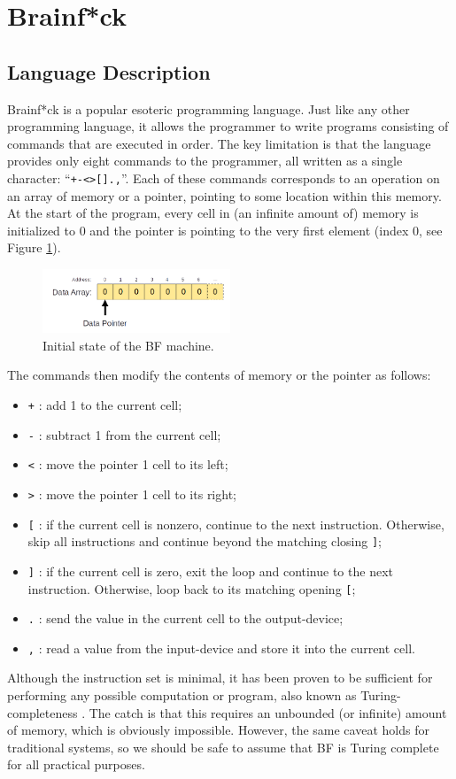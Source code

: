 \section{Brainf*ck}\label{sec:brainfck}
\subsection{Language Description}
Brainf*ck is a popular esoteric programming language. Just like any other programming language, it allows the programmer to write programs consisting of commands that are executed in order. The key limitation is that the language provides only eight commands to the programmer, all written as a single character: ``\texttt{+-<>[].,}''. Each of these commands corresponds to an operation on an array of memory or a pointer, pointing to some location within this memory. At the start of the program, every cell in (an infinite amount of) memory is initialized to 0 and the pointer is pointing to the very first element (index 0, see Figure \ref{fig:bfmachine_initial}).
%
\begin{figure}[H]
  \centering
  \includegraphics[width=0.5\textwidth]{img/bfmachine_initial}
  \caption{Initial state of the BF machine.}
  \label{fig:bfmachine_initial}
\end{figure}
%
The commands then modify the contents of memory or the pointer as follows:
\begin{itemize}
\item \texttt{+} : add 1 to the current cell;
\item \texttt{-} : subtract 1 from the current cell;
\item \texttt{<} : move the pointer 1 cell to its left;
\item \texttt{>} : move the pointer 1 cell to its right;
\item \texttt{[} : if the current cell is nonzero, continue to the next instruction. Otherwise, skip all instructions and continue beyond the matching closing \texttt{]};
\item \texttt{]} : if the current cell is zero, exit the loop and continue to the next instruction. Otherwise, loop back to its matching opening \texttt{[};
\item \texttt{.} : send the value in the current cell to the output-device;
\item \texttt{,} : read a value from the input-device and store it into the current cell.
\end{itemize}
Although the instruction set is minimal, it has been proven to be sufficient for performing any possible computation or program, also known as Turing-completeness \cite{esolangs-bf}. The catch is that this requires an unbounded (or infinite) amount of memory, which is obviously impossible. However, the same caveat holds for traditional systems, so we should be safe to assume that BF is Turing complete for all practical purposes.

